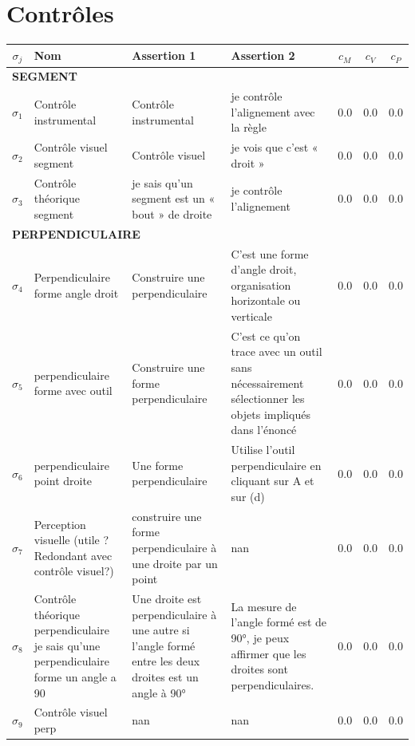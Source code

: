 \section*{Contrôles}
\begin{longtable}{|c|p{3cm}|p{4cm}|p{4cm}|c|c|c|}
\hline
$\sigma_j$ & Nom & Assertion 1 & Assertion 2 & $c_M$ & $c_V$ & $c_P$ \\ \hline
\multicolumn{7}{|l|}{\textbf{SEGMENT}} \\ \hline
$\sigma_{1}$\label{cont_inst_seg} & Contrôle instrumental & Contrôle instrumental & je contrôle l’alignement avec la règle & 0.0 & 0.0 & 0.0 \\ \hline
$\sigma_{2}$\label{cont_visu_seg} & Contrôle visuel segment & Contrôle visuel & je vois que c’est « droit » & 0.0 & 0.0 & 0.0 \\ \hline
$\sigma_{3}$\label{cont_theo_seg} & Contrôle théorique segment & je sais qu’un segment est un « bout » de droite & je contrôle l’alignement & 0.0 & 0.0 & 0.0 \\ \hline
\multicolumn{7}{|l|}{\textbf{PERPENDICULAIRE}} \\ \hline
$\sigma_{4}$\label{cont_perp_form} & Perpendiculaire forme angle droit & Construire une perpendiculaire & C'est une forme d'angle droit, organisation horizontale ou verticale & 0.0 & 0.0 & 0.0 \\ \hline
$\sigma_{5}$\label{cont_perp_form_outil} & perpendiculaire forme avec outil & Construire une forme perpendiculaire & C'est ce qu'on trace avec un outil sans nécessairement sélectionner les objets impliqués dans l'énoncé & 0.0 & 0.0 & 0.0 \\ \hline
$\sigma_{6}$\label{cont_perp_a_droite} & perpendiculaire point droite & Une forme perpendiculaire & Utilise l'outil perpendiculaire en cliquant sur A et sur (d) & 0.0 & 0.0 & 0.0 \\ \hline
$\sigma_{7}$\label{cont_perp_form_outil_perp} & Perception visuelle (utile ? Redondant avec contrôle visuel?) & construire une forme perpendiculaire à une droite par un point & nan & 0.0 & 0.0 & 0.0 \\ \hline
$\sigma_{8}$\label{cont_theo_perp} & Contrôle théorique perpendiculaire je sais qu’une perpendiculaire forme un angle a 90 & Une droite est perpendiculaire à une autre si l'angle formé entre les deux droites est un angle à 90° & La mesure de l'angle formé est de 90°, je peux affirmer que les droites sont perpendiculaires. & 0.0 & 0.0 & 0.0 \\ \hline
$\sigma_{9}$\label{cont_visu_perp} & Contrôle visuel perp & nan & nan & 0.0 & 0.0 & 0.0 \\ \hline

\end{longtable}
